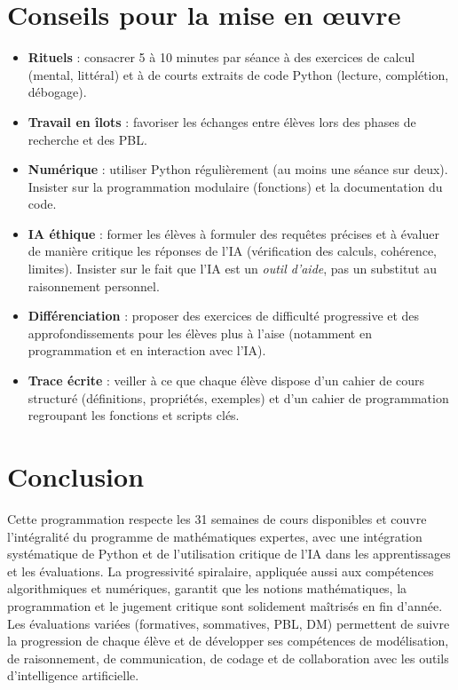 \documentclass[a4paper,12pt]{article}
\begin{document}
	\section{Conseils pour la mise en œuvre}
	\begin{itemize}
		\item \textbf{Rituels} : consacrer 5 à 10 minutes par séance à des exercices de calcul (mental, littéral) et à de courts extraits de code Python (lecture, complétion, débogage).
		\item \textbf{Travail en îlots} : favoriser les échanges entre élèves lors des phases de recherche et des PBL.
		\item \textbf{Numérique} : utiliser Python régulièrement (au moins une séance sur deux). Insister sur la programmation modulaire (fonctions) et la documentation du code.
		\item \textbf{IA éthique} : former les élèves à formuler des requêtes précises et à évaluer de manière critique les réponses de l’IA (vérification des calculs, cohérence, limites). Insister sur le fait que l’IA est un \emph{outil d’aide}, pas un substitut au raisonnement personnel.
		\item \textbf{Différenciation} : proposer des exercices de difficulté progressive et des approfondissements pour les élèves plus à l’aise (notamment en programmation et en interaction avec l’IA).
		\item \textbf{Trace écrite} : veiller à ce que chaque élève dispose d’un cahier de cours structuré (définitions, propriétés, exemples) et d’un cahier de programmation regroupant les fonctions et scripts clés.
	\end{itemize}
	
	\section*{Conclusion}
	Cette programmation respecte les 31 semaines de cours disponibles et couvre l’intégralité du programme de mathématiques expertes, avec une intégration systématique de Python et de l’utilisation critique de l’IA dans les apprentissages et les évaluations. La progressivité spiralaire, appliquée aussi aux compétences algorithmiques et numériques, garantit que les notions mathématiques, la programmation et le jugement critique sont solidement maîtrisés en fin d’année. Les évaluations variées (formatives, sommatives, PBL, DM) permettent de suivre la progression de chaque élève et de développer ses compétences de modélisation, de raisonnement, de communication, de codage et de collaboration avec les outils d’intelligence artificielle.
	
\end{document}
